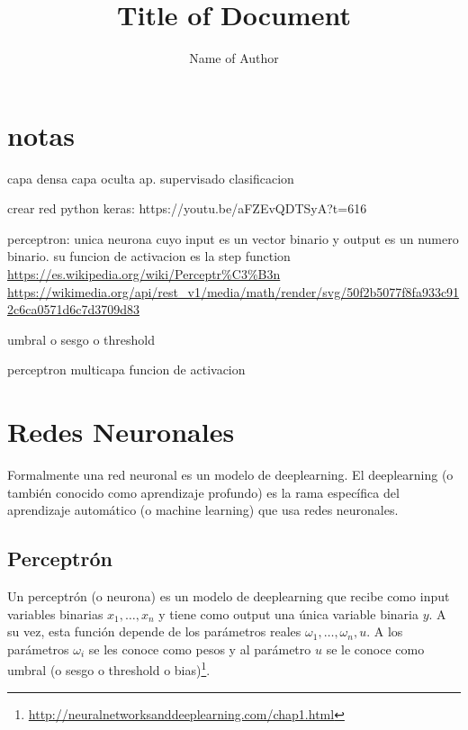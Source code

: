 \documentclass{article}
\title{Title of Document}
\author{Name of Author}
\begin{document}
\maketitle

\section{notas}

capa densa
capa oculta
ap. supervisado
clasificacion



crear red python keras: https://youtu.be/aFZEvQDTSyA?t=616

perceptron: unica neurona cuyo input es un vector binario y output es un numero binario. su funcion de activacion es la step function
\url{https://es.wikipedia.org/wiki/Perceptr%C3%B3n}
\url{https://wikimedia.org/api/rest_v1/media/math/render/svg/50f2b5077f8fa933c912c6ca0571d6c7d3709d83}

umbral o sesgo o threshold

perceptron multicapa 
funcion de activacion

\section{Redes Neuronales}


Formalmente una red neuronal es un modelo de deeplearning. El deeplearning (o también conocido como aprendizaje profundo) es la rama específica del aprendizaje automático (o machine learning) que usa redes neuronales.\\


\subsection{Perceptrón}

Un perceptrón (o neurona) es un modelo de deeplearning que recibe como input variables binarias $x_1,\hdots,x_n $ y tiene como output una única variable binaria $y$. A su vez, esta función depende de los parámetros reales $\omega_1,\hdots,\omega_n,u $. A los parámetros $\omega_i$ se les conoce como pesos y al parámetro $u$ se le conoce como umbral (o sesgo o threshold o bias)\footnote{\url{http://neuralnetworksanddeeplearning.com/chap1.html}}.\\
\end{document}
